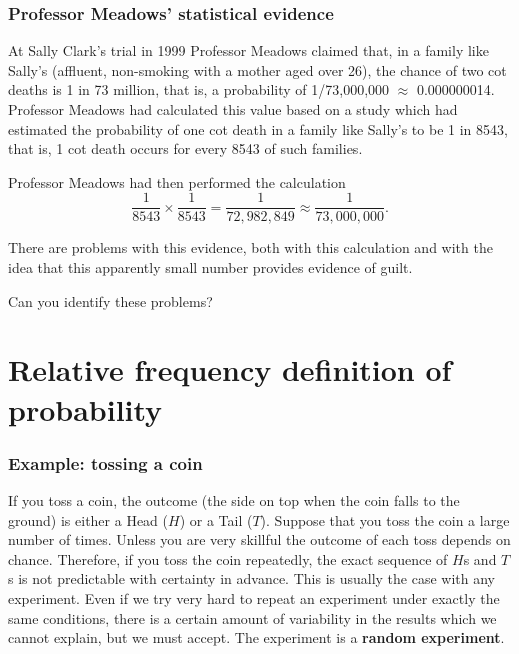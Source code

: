 \documentclass[
  11pt,
  british,
  openany, a4paper]{book}
\begin{document}
\hypertarget{professor-meadows-statistical-evidence}{%
\subsubsection*{Professor Meadows' statistical evidence}\label{professor-meadows-statistical-evidence}}

At Sally Clark's trial in 1999 Professor Meadows claimed that, in a family like Sally's (affluent, non-smoking with a mother aged over 26), the chance of two cot deaths is 1 in 73 million, that is, a probability of 1/73,000,000 \(\approx\) 0.000000014. Professor Meadows had calculated this value based on a study which had estimated the probability of one cot death in a family like Sally's to be 1 in 8543, that is, 1 cot death occurs for every 8543 of such families.

Professor Meadows had then performed the calculation
\[\frac{1}{8543}\times\frac{1}{8543}=\frac{1}{72,982,849}\approx\frac{1}{73,000,000}.\]

There are problems with this evidence, both with this calculation and with the idea that this apparently small number provides evidence of guilt.

Can you identify these problems?

\hypertarget{relative-frequency-definition-of-probability}{%
\section{Relative frequency definition of probability}\label{relative-frequency-definition-of-probability}}

\hypertarget{example-tossing-a-coin}{%
\subsubsection*{Example: tossing a coin}\label{example-tossing-a-coin}}

If you toss a coin, the outcome (the side on top when the coin falls to the ground) is either a Head (\(H\)) or a Tail (\(T\)). Suppose that you toss the coin a large number of times. Unless you are very skillful the outcome of each toss depends on chance. Therefore, if you toss the coin repeatedly, the exact sequence of \(H\)s and \(T\)s is not predictable with certainty in advance. This is usually the case with any experiment. Even if we try very hard to repeat an experiment under exactly the same conditions, there is a certain amount of variability in the results which we cannot explain, but we must accept. The experiment is a
\textbf{random experiment}.
\end{document}
